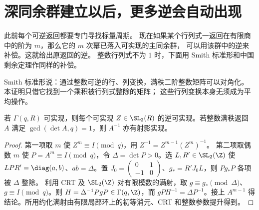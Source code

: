 \section{深同余群建立以后，更多逆会自动出现}
此前每个可逆返回都要专门寻找标量周期。
现在如果某个行列式一返回在有限商中的阶为 $m$，那么它的 $m$ 次幂已落入可实现的主同余群，
可以用该群中的逆来补偿。这就给出原返回的逆。
整数行列式不为 $1$ 时，下面用 Smith 标准形和中国剩余定理作同样的补偿。

Smith 标准形说：通过整数可逆的行、列变换，满秩二阶整数矩阵可以对角化。
本证明只借它找到一个乘积被行列式整除的矩阵；
这些行列变换本身无须成为平均操作。

\begin{lemma}[获得深同余群以后的正向逆]\label{lem:inverse}
若 $\Gamma(q,R)$ 可实现，则每个可实现 $Z\in\SL_2(R)$ 的逆可实现。若整数满秩返回 $A$ 满足 $\gcd(\det A,q)=1$，则 $A^{-1}$ 亦有射影实现。
\end{lemma}
\begin{proof}
第一项取 $m$ 使 $Z^m\equiv I\pmod q$，用 $Z^{-1}=Z^{m-1}(Z^m)^{-1}$。
第二项取偶数 $m$ 使 $P=A^m\equiv I\pmod q$，令 $\Delta=\det P>0$。选 $L,R'\in\SL_2(\Z)$ 使 $LPR'=\diag(a,b)$、$ab=\Delta$。置 $J_0=\left(\begin{smallmatrix}0&1\\-1&0\end{smallmatrix}\right)$、$g_*=R'J_0L$，则 $Pg_*P$ 各项被 $\Delta$ 整除。
利用 CRT 及 $\SL_2(\Z)$ 对有限模数的满射，取 $g\equiv g_*\pmod\Delta$、$g\equiv I\pmod q$。则 $H=\Delta^{-1}PgP\in\Gamma(q,\Z)$，而 $gPH^{-1}=\Delta P^{-1}$。接上 $A^{m-1}$ 得结论。所用约化满射由有限局部环上的初等消元、CRT 和整数参数提升得到。
\end{proof}

